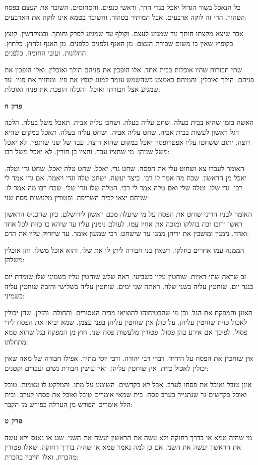 \documentclass[12pt, openany]{book}
\newcommand{\sethebfont}{
\fontsize{10.5pt}{21.0pt} \selectfont
}
\newcommand{\textblock}[1]{
{\sethebfont #1\\}	
}
\newcommand{\sectname}{}
\newcommand{\newsection}[1]{
	\addcontentsline{toc}{section}{#1}
	\renewcommand{\sectname}{#1}	
	\vspace{-\baselineskip}
	\begin{center}
		\textbf{%
\fontsize{16pt}{16pt}\selectfont
			#1}
	\end{center}
	\vspace{-\baselineskip}
	\nopagebreak
}
\begin{document}
\textblock{כל הנאכל בשור הגדול יאכל בגדי הרך. וראשי כנפים. והסחוסים. השובר את העצם בפסח הטהור. הרי זה לוקה ארבעים. אבל המותיר בטהור. והשובר בטמא אינו לוקה את הארבעים:  }
\textblock{אבר שיצא מקצתו חותך עד שמגיע לעצם. וקולף עד שמגיע לפרק וחותך. ובמוקדשין. קוצץ בקופיץ שאין בו משום שבירת העצם. מן האגף ולפנים כלפנים. מן האגף ולחוץ. כלחוץ. החלונות. ועובי החומה. כלפנים:  }
\textblock{שתי חבורות שהיו אוכלות בבית אחד. אלו הופכין את פניהם הילך ואוכלין. ואלו הופכין את פניהם. הילך ואוכלין. והמיחם באמצע כשהשמש עומד למזוג קופץ את פיו. ומחזיר את פניו. עד שמגיע אצל חבורתו ואוכל. והכלה הופכת את פניה ואוכלת:  }
\newsection{פרק ח}
\textblock{האשה בזמן שהיא בבית בעלה. שחט עליה בעלה. ושחט עליה אביה. תאכל משל בעלה. הלכה רגל ראשון לעשות בבית אביה. שחט עליה אביה. ושחט עליה בעלה. תאכל במקום שהיא רוצה. יתום ששחטו עליו אפטרופסין יאכל במקום שהוא רוצה. עבד של שני שותפין. לא יאכל משל שניהן. מי שחציו עבד. וחציו בן חורין. לא יאכל משל רבו: 
}
\textblock{האומר לעבדו צא ושחוט עלי את הפסח. שחט גדי. יאכל. שחט טלה יאכל. שחט גדי וטלה. יאכל מן הראשון. שכח מה אמר לו רבו. כיצד יעשה. ישחט טלה וגדי ויאמר. אם גדי אמר לי רבי. גדי שלו. וטלה שלי ואם טלה אמר לי רבי. הטלה שלו וגדי שלי. שכח רבו מה אמר לו. שניהם יצאו לבית השריפה. ופטורין מלעשות פסח שני: 
}
\textblock{האומר לבניו הריני שוחט את הפסח על מי שיעלה מכם ראשון לירושלם. כיון שהכניס הראשון ראשו ורובו זכה בחלקו ומזכה את אחיו עמו. לעולם נימנין עליו עד שיהא בו כזית לכל אחד ואחד. נימנין ומושכין את ידיהן ממנו עד שישחט. רבי שמעון אומר. עד שיזרוק עליו את הדם: 
}
\textblock{הממנה עמו אחרים בחלקו. רשאין בני חבורה ליתן לו את שלו. והוא אוכל משלו. והן אוכלין משלהן: 
}
\textblock{זב שראה שתי ראיות. שוחטין עליו בשביעי. ראה שלש שוחטין עליו בשמיני שלו שומרת יום כנגד יום. שוחטין עליה בשני שלה. ראתה שני ימים. שוחטין עליה בשלישי והזבה שוחטין עליה בשמיני: 
}
\textblock{האונן והמפקח את הגל. וכן מי שהבטיחוהו להוציאו מבית האסורים. והחולה. והזקן. שהן יכולין לאכול כזית שוחטין עליהן. על כולן אין שוחטין עליהן בפני עצמן. שמא יביאו את הפסח לידי פסול. לפיכך אם אירע בהן פסול. פטורין מלעשות פסח שני. חוץ מן המפקח בגל שהוא טמא מתחלתו: 
}
\textblock{אין שוחטין את הפסח על היחיד. דברי רבי יהודה. ורבי יוסי מתיר. אפילו חבורה של מאה שאין יכולין לאכול כזית. אין שוחטין עליהן. ואין עושין חבורת נשים ועבדים וקטנים: 
}
\textblock{אונן טובל ואוכל את פסחו לערב. אבל לא בקדשים. השומע על מתו. והמלקט לו עצמות. טובל ואוכל בקדשים גר שנתגייר בערב פסח. בית שמאי אומרים טובל ואוכל את פסחו לערב. ובית הלל אומרים הפורש מן הערלה כפורש מן הקבר: 
}
\newsection{פרק ט}
\textblock{מי שהיה טמא או בדרך רחוקה ולא עשה את הראשון יעשה את השני. שגג או נאנס ולא עשה את הראשון יעשה את השני. אם כן למה נאמר טמא או שהיה בדרך רחוקה. שאלו פטורין מהכרת. ואלו חייבין בהכרת: }
\end{document}
